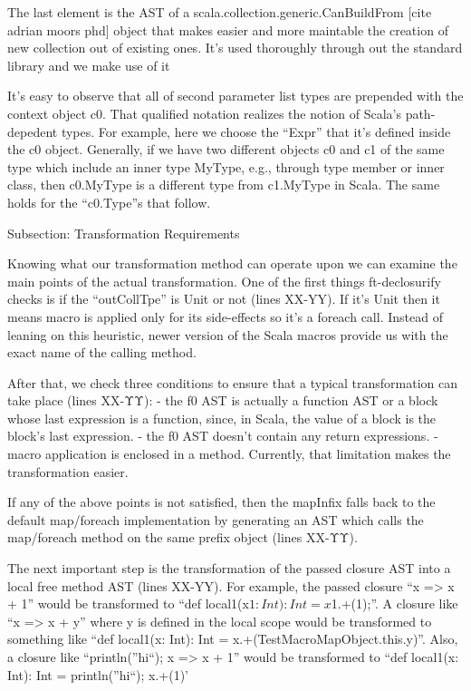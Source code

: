 The last element is the AST of a scala.collection.generic.CanBuildFrom [cite
adrian moors phd] object that makes easier and more maintable the creation of
new collection out of existing ones. It's used thoroughly through out the
standard library and we make use of it   

It's easy to observe that all of second parameter list types are prepended
with the context object c0. That qualified notation realizes the notion of
Scala's path-depedent types. For example, here we choose the ``Expr'' that it's
defined inside the c0 object. Generally, if we have two different objects c0 and
c1 of the same type which include an inner type MyType, e.g., through type
member or inner class,  then c0.MyType is a different type from c1.MyType in
Scala. The same holds for the ``c0.Type''s that follow.


Subsection: Transformation Requirements

Knowing what our transformation method can operate upon we can examine the
main points of the actual transformation. One of the first things ft-declosurify
checks is if the ``outCollTpe'' is Unit or not (lines XX-YY). If it's Unit then
it means
macro is applied only for its side-effects so it's a foreach call. Instead of
leaning on this heuristic, newer version of the Scala macros provide us with the
exact name of the calling method.

After that, we check three conditions to ensure that a typical
transformation can take place (lines XX-ΥΥ):
- the f0 AST is actually a function AST or a block whose last
expression is a function, since, in Scala, the value of a block is the block's
last expression.
- the f0 AST doesn't contain any return expressions.
- macro application is enclosed in a method. Currently, that limitation makes
the transformation easier.

If any of the above points is not satisfied, then the mapInfix falls back to the
default map/foreach implementation by generating an AST which
calls the map/foreach method on the same prefix object (lines XX-ΥΥ).

The next important step is the transformation of the passed closure AST
into a local free method AST (lines XX-YY). For example, the passed closure ``x
=> x + 1'' would be transformed to ``def local1(x$1: Int): Int = x$1.+(1);''. A
closure like ``x => x + y'' where y is defined in the local scope would be
transformed to something like ``def local1(x: Int): Int =
x.+(TestMacroMapObject.this.y)''. Also, a closure like ``{println(''hi``); x =>
x + 1}'' would be transformed to ``def local1(x: Int): Int = {println(''hi``);
x.+(1)}'


